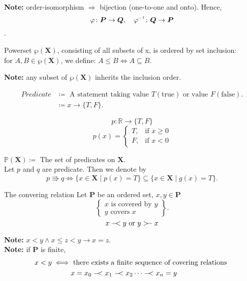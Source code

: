 \textbf{Note:} order-isomorphism $\Rightarrow$ bijection (one-to-one and onto). Hence, 
\[
    \varphi \colon \bm{P} \rightarrow \bm{Q}, \quad \varphi\inv \colon \bm{Q} \rightarrow \bm{P}
\].

\begin{definition}
    Powerset $\wp(\bm{X})$, consisting of all subsets of x, is ordered by set inclusion:\\
    for $A, B \in \wp(\bm{X})$, we define: $A \leq B \iff A \subseteq B$.
\end{definition}
\textbf{Note:} any subset of $\wp(\bm{X})$ inherits the inclusion order.

\begin{align*}
    Predicate &\coloneqq \text{ A statement taking value } T (\text{true}) \text{ or value } F (\text{false}).\\
    &\coloneqq x \rightarrow \{T, F\}.
\end{align*}
\begin{example}
\[
    p \colon \mathbb{R} \rightarrow \{T, F\}
\]
\[
    p(x) = \begin{cases} T, &\text{if } x \geq 0 \\ 
                        F, &\text{if } x < 0
            \end{cases}
\]
\end{example}
$\mathbb{P}(\bm{X}) \coloneqq$ The set of predicates on $\bm{X}$.\\
Let $p$ and $q$ are predicate. Then we denote by 
\[
    p \stackrel{}{\Rrightarrow} q \iff \{x \in \bm{X} \mid p(x) = T \} \subseteq \{x \in \bm{X} \mid g(x) = T \}.
\]

\begin{definition}{The convering relation}
    Let $\bm{P}$ be an ordered set, $x, y \in \bm{P}$ 
    \[
        \left\{
        \begin{array}{l}
            x \text{ is covered by } y \\
            y \text{ covers } x
        \end{array}
        \right\}.
    \]
    \[
        x \mathrel{-\mkern-4mu}< y \text{ or } y >\mathrel{\mkern-4mu-} x
    \]
\end{definition}

\textbf{Note:} $x < y \land x \leq z < y \rightarrow x = z$.\\
\textbf{Note:} if $\bm{P}$ is finite, 
\begin{align*}
    x < y \iff &\text{ there exists a finite sequence of covering relations }\\
    &x = x_0 \coveredby x_1 \coveredby x_2 \dots \coveredby x_n = y
\end{align*}

